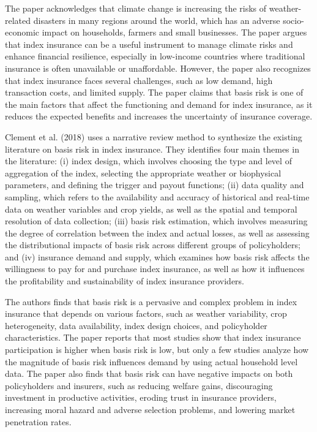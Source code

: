 \documentclass[a4paper,12pt]{article}
\begin{document}
The paper acknowledges that climate change is increasing the risks of weather-related disasters in many regions around the world, which has an adverse socio-economic impact on households, farmers and small businesses. The paper argues that index insurance can be a useful instrument to manage climate risks and enhance financial resilience, especially in low-income countries where traditional insurance is often unavailable or unaffordable. However, the paper also recognizes that index insurance faces several challenges, such as low demand, high transaction costs, and limited supply. The paper claims that basis risk is one of the main factors that affect the functioning and demand for index insurance, as it reduces the expected benefits and increases the uncertainty of insurance coverage.

Clement et al. (2018) uses a narrative review method to synthesize the existing literature on basis risk in index insurance. They identifies four main themes in the literature: (i) index design, which involves choosing the type and level of aggregation of the index, selecting the appropriate weather or biophysical parameters, and defining the trigger and payout functions; (ii) data quality and sampling, which refers to the availability and accuracy of historical and real-time data on weather variables and crop yields, as well as the spatial and temporal resolution of data collection; (iii) basis risk estimation, which involves measuring the degree of correlation between the index and actual losses, as well as assessing the distributional impacts of basis risk across different groups of policyholders; and (iv) insurance demand and supply, which examines how basis risk affects the willingness to pay for and purchase index insurance, as well as how it influences the profitability and sustainability of index insurance providers.

The authors finds that basis risk is a pervasive and complex problem in index insurance that depends on various factors, such as weather variability, crop heterogeneity, data availability, index design choices, and policyholder characteristics. The paper reports that most studies show that index insurance participation is higher when basis risk is low, but only a few studies analyze how the magnitude of basis risk influences demand by using actual household level data. The paper also finds that basis risk can have negative impacts on both policyholders and insurers, such as reducing welfare gains, discouraging investment in productive activities, eroding trust in insurance providers, increasing moral hazard and adverse selection problems, and lowering market penetration rates.
\end{document}
